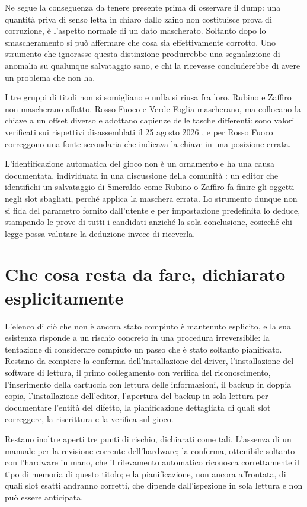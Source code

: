 Ne segue la conseguenza da tenere presente prima di osservare il dump: una quantità priva di senso letta in chiaro dallo zaino non costituisce prova di corruzione, è l'aspetto normale di un dato mascherato. Soltanto dopo lo smascheramento si può affermare che cosa sia effettivamente corrotto. Uno strumento che ignorasse questa distinzione produrrebbe una segnalazione di anomalia su qualunque salvataggio sano, e chi la ricevesse concluderebbe di avere un problema che non ha.

I tre gruppi di titoli non si somigliano e nulla si riusa fra loro. Rubino e Zaffiro non mascherano affatto. Rosso Fuoco e Verde Foglia mascherano, ma collocano la chiave a un offset diverso e adottano capienze delle tasche differenti: sono valori verificati sui rispettivi disassemblati il 25 agosto 2026 \cite{pokefirered,pokeruby}, e per Rosso Fuoco correggono una fonte secondaria che indicava la chiave in una posizione errata.

L'identificazione automatica del gioco non è un ornamento e ha una causa documentata, individuata in una discussione della comunità \cite{projectpokemon}: un editor che identifichi un salvataggio di Smeraldo come Rubino o Zaffiro fa finire gli oggetti negli slot sbagliati, perché applica la maschera errata. Lo strumento dunque non si fida del parametro fornito dall'utente e per impostazione predefinita lo deduce, stampando le prove di tutti i candidati anziché la sola conclusione, cosicché chi legge possa valutare la deduzione invece di riceverla.

\section{Che cosa resta da fare, dichiarato esplicitamente}

L'elenco di ciò che non è ancora stato compiuto è mantenuto esplicito, e la sua esistenza risponde a un rischio concreto in una procedura irreversibile: la tentazione di considerare compiuto un passo che è stato soltanto pianificato. Restano da compiere la conferma dell'installazione del driver, l'installazione del software di lettura, il primo collegamento con verifica del riconoscimento, l'inserimento della cartuccia con lettura delle informazioni, il backup in doppia copia, l'installazione dell'editor, l'apertura del backup in sola lettura per documentare l'entità del difetto, la pianificazione dettagliata di quali slot correggere, la riscrittura e la verifica sul gioco.

Restano inoltre aperti tre punti di rischio, dichiarati come tali. L'assenza di un manuale per la revisione corrente dell'hardware; la conferma, ottenibile soltanto con l'hardware in mano, che il rilevamento automatico riconosca correttamente il tipo di memoria di questo titolo; e la pianificazione, non ancora affrontata, di quali slot esatti andranno corretti, che dipende dall'ispezione in sola lettura e non può essere anticipata.

